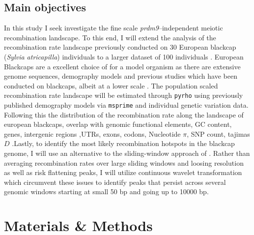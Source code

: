 \documentclass[12pt,a4paper]{article}
\begin{document}
\subsection{Main objectives}
In this study I seek investigate the fine scale \textit{prdm9}--independent meiotic recombination landscape. To this end, I will extend the analysis of the recombination rate landscape previously conducted on 30 European blackcap (\textit{Sylvia atricapilla}) individuals to a larger dataset of 100 individuals \parencite{bascon-cardozo-fine-scale-2024}. European Blackcaps are a excellent choice of for a model organism as there are extensive genome sequences, demography models and previous studies which have been conducted on blackcaps, albeit at a lower scale \parencite{ishigohoka_high-recombining_2025, bascon-cardozo-fine-scale-2024, bours_blackcap_2023}. The population scaled recombination rate landscape will be estimated through \texttt{pyrho} using previously published demography models via \texttt{msprime} and individual genetic variation data\parencite{ishigohoka_high-recombining_2025, bascon-cardozo-fine-scale-2024}. Following this the distribution of the recombination rate along the landscape of european blackcaps, overlap with genomic functional elements, GC content, genes, intergenic regions ,UTRs, exons, codons, Nucleotide $\pi$, SNP count, tajimas $D$ \parencite{bascon-cardozo-fine-scale-2024, singhal_2015}.Lastly, to identify the most likely recombination hotspots in the blackcap genome, I will use an alternative to the sliding-window approach of \cite{wooldridge_rapid_2023}. Rather than averaging recombination rates over large sliding windows and loosing resolution as well as risk flattening peaks, I will utilize continuous wavelet transformation which circumvent these issues \parencite{Mexican-hat-wavelet} to identify peaks that persist across several genomic windows starting at small 50 bp and going up to 10000 bp.

\section{Materials \& Methods}
\end{document}

